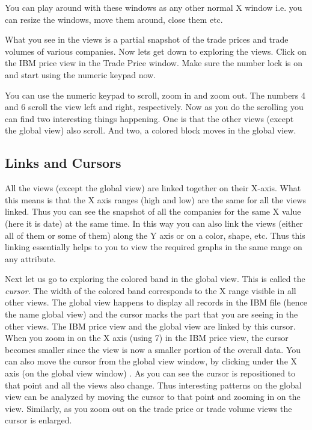 You can play around with these windows as any other normal X window
i.e. you can resize the windows, move them around, close them etc.

What you see in the views is a partial snapshot of the trade prices
and trade volumes of various companies. Now lets get down to exploring
the views. Click on the IBM price view in the Trade Price window. Make
sure the number lock is on and start using the numeric keypad now.

You can use the numeric keypad to scroll, zoom in and zoom out. The
numbers 4 and 6 scroll the view left and right, respectively. Now as
you do the scrolling you can find two interesting things
happening. One is that the other views (except the global view) also
scroll. And two, a colored block moves in the global view.

\subsection{Links and Cursors}

All the views (except the global view) are linked together on their
X-axis. What this means is that the X axis ranges (high and low) are
the same for all the views linked. Thus you can see the snapshot of
all the companies for the same X value (here it is date) at the same
time. In this way you can also link the views (either all of them or
some of them) along the Y axis or on a color, shape, etc. Thus this
linking essentially helps to you to view the required graphs in the
same range on any attribute.

Next let us go to exploring the colored band in the global view. This
is called the {\em cursor}. The width of the colored band corresponds
to the X range visible in all other views. The global view happens to
display all records in the IBM file (hence the name global view) and
the cursor marks the part that you are seeing in the other views. The
IBM price view and the global view are linked by this cursor. When you
zoom in on the X axis (using 7) in the IBM price view, the cursor
becomes smaller since the view is now a smaller portion of the overall
data. You can also move the cursor from the global view window, by
clicking under the X axis (on the global view window) . As you can see
the cursor is repositioned to that point and all the views also
change. Thus interesting patterns on the global view can be analyzed
by moving the cursor to that point and zooming in on the
view. Similarly, as you zoom out on the trade price or trade volume
views the cursor is enlarged.

